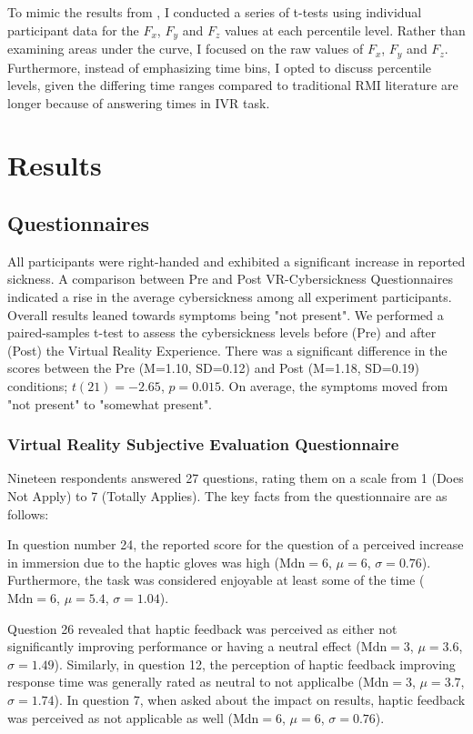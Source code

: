\documentclass[12pt,oneside,openright]{report}
\begin{document}
To mimic the results from \Cite{SALTAFOSSI2023108642}, I conducted a series of t-tests using individual participant data for the $F_x$, $F_y$ and $F_z$ values at each percentile level. Rather than examining areas under the curve, I focused on the raw values of $F_x$, $F_y$ and $F_z$. Furthermore, instead of emphasizing time bins, I opted to discuss percentile levels, given the differing time ranges compared to traditional RMI literature are longer because of answering times in IVR task.

\section*{Results}
\subsection*{Questionnaires}
 
All participants were right-handed and exhibited a significant increase in reported sickness. A comparison between Pre and Post VR-Cybersickness Questionnaires indicated a rise in the average cybersickness among all experiment participants. Overall results leaned towards symptoms being "not present". We performed a paired-samples t-test to assess the cybersickness levels before (Pre) and after (Post) the Virtual Reality Experience. There was a significant difference in the scores between the Pre (M=1.10, SD=0.12) and Post (M=1.18, SD=0.19) conditions; $t(21)=-2.65$, $p = 0.015$. On average, the symptoms moved from "not present" to "somewhat present". 

\subsubsection*{Virtual Reality Subjective Evaluation Questionnaire}
Nineteen respondents answered 27 questions, rating them on a scale from 1 (Does Not Apply) to 7 (Totally Applies). The key facts from the questionnaire are as follows:
    
In question number 24, the reported score for the question of a perceived increase in immersion due to the haptic gloves was high ($\text{Mdn} = 6$, $\mu = 6$, $\sigma = 0.76$). Furthermore, the task was considered enjoyable at least some of the time ($\text{Mdn} = 6$, $\mu = 5.4$, $\sigma = 1.04$).
        
Question 26 revealed that haptic feedback was perceived as either not significantly improving performance or having a neutral effect ($\text{Mdn} = 3$, $\mu = 3.6$, $\sigma = 1.49$). Similarly, in question 12, the perception of haptic feedback improving response time was generally rated as neutral to not applicalbe ($\text{Mdn} = 3$, $\mu = 3.7$, $\sigma = 1.74$). In question 7, when asked about the impact on results, haptic feedback was perceived as not applicable as well ($\text{Mdn} = 6$, $\mu = 6$, $\sigma = 0.76$).
    
\end{document}
